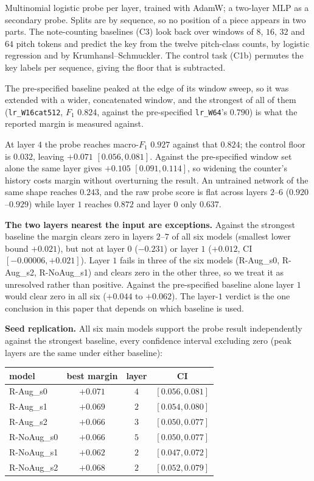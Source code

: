 \documentclass{article}
\begin{document}
Multinomial logistic probe per layer, trained with AdamW; a two-layer MLP as a
secondary probe. Splits are by sequence, so no position of a piece appears in two
parts. The note-counting baselines (C3) look back over windows of $8$, $16$, $32$ and
$64$ pitch tokens and predict the key from the twelve pitch-class counts, by logistic
regression and by Krumhansl--Schmuckler. The control task (C1b) permutes the key
labels per sequence, giving the floor that is subtracted.

The pre-specified baseline peaked at the edge of its window sweep, so it was extended
with a wider, concatenated window, and the strongest of all of them
(\texttt{lr\_W16cat512}, $F_1$ $0.824$, against the pre-specified
\texttt{lr\_W64}'s $0.790$) is what the reported margin is measured against.

At layer $4$ the probe reaches macro-$F_1$ $0.927$ against that $0.824$; the control
floor is $0.032$, leaving $+0.071$ $[0.056,0.081]$. Against the pre-specified window
set alone the same layer gives $+0.105$ $[0.091,0.114]$, so widening the counter's
history costs margin without overturning the result. An untrained network of the same
shape reaches $0.243$, and the raw probe score is flat across layers $2$--$6$
($0.920$--$0.929$) while layer $1$ reaches $0.872$ and layer $0$ only $0.637$.

\textbf{The two layers nearest the input are exceptions.} Against the strongest
baseline the margin clears zero in layers $2$--$7$ of all six models (smallest lower
bound $+0.021$), but not at layer $0$ ($-0.231$) or layer $1$ ($+0.012$, CI
$[-0.00006, +0.021]$). Layer $1$ fails in three of the six models
(R-Aug\_s0, R-Aug\_s2, R-NoAug\_s1) and clears zero in the other three, so we treat
it as unresolved rather than positive. Against the pre-specified baseline alone layer
$1$ would clear zero in all six ($+0.044$ to $+0.062$). The layer-$1$ verdict is the
one conclusion in this paper that depends on which baseline is used.

\textbf{Seed replication.} All six main models support the probe result
independently against the strongest baseline, every confidence interval
excluding zero (peak layers are the same under either baseline):

\begin{center}\footnotesize
\begin{tabular}{@{}lccc@{}}
\toprule
model & best margin & layer & CI\\
\midrule
R-Aug\_s0   & $+0.071$ & $4$ & $[0.056,0.081]$\\
R-Aug\_s1   & $+0.069$ & $2$ & $[0.054,0.080]$\\
R-Aug\_s2   & $+0.066$ & $3$ & $[0.050,0.077]$\\
R-NoAug\_s0 & $+0.066$ & $5$ & $[0.050,0.077]$\\
R-NoAug\_s1 & $+0.062$ & $2$ & $[0.047,0.072]$\\
R-NoAug\_s2 & $+0.068$ & $2$ & $[0.052,0.079]$\\
\bottomrule
\end{tabular}
\end{center}
\end{document}
